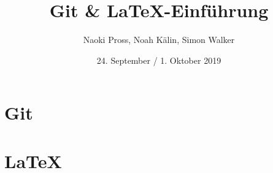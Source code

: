\documentclass{beamer}
\title{Git \& \textrm{\LaTeX}-Einführung}
\author{
	Naoki Pross\inst{1},
    Noah Kälin\inst{1},
    Simon Walker\inst{1}
}
\institute[HSR]{\inst{1}Hochschule f\"ur Technick Rapperswil}
\date{24. September / 1. Oktober 2019}
\begin{document}
\frame{\titlepage}

\part{Git}

\part{\textrm{\LaTeX}}

\end{document}
